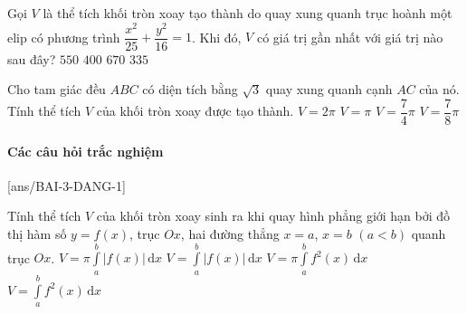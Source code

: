 \begin{vd}%
	Gọi $V$ là thể tích khối tròn xoay tạo thành do quay xung quanh trục hoành một elip có phương trình $\dfrac{x^2}{25}+\dfrac{y^2}{16}=1$. Khi đó, $V$ có giá trị gần nhất với giá trị nào sau đây?
	\choice
	{$550$}
	{$400$}
	{$670$}
	{\True $335$}
\end{vd}

\begin{vd}%
	Cho tam giác đều $ABC$ có diện tích bằng $\sqrt{3}$ quay xung quanh cạnh $AC$ của nó. Tính thể tích $V$ của khối tròn xoay được tạo thành. 
	\choice
	{\True $V=2\pi$}
	{$V=\pi$}
	{$V=\dfrac{7}{4}\pi$}
	{$V=\dfrac{7}{8}\pi$}
\end{vd}

\paragraph{Các câu hỏi trắc nghiệm}

[ans/BAI-3-DANG-1]

\begin{ex}%
	Tính thể tích $V$ của khối tròn xoay sinh ra khi quay hình phẳng giới hạn bởi đồ thị hàm số $y=f(x)$, trục $Ox$, hai đường thẳng $x=a$, $x=b$ $(a<b)$ quanh trục $Ox$. 
	\choice
	{$V=\pi\displaystyle\int\limits_a^b\left|f(x)\right|\mathrm{\,d}x$}
	{$V=\displaystyle\int\limits_a^b\left|f(x)\right|\mathrm{\,d}x$}
	{\True $V=\pi\displaystyle\int\limits_a^b f^2(x)\mathrm{\,d}x$}
	{$V=\displaystyle\int\limits_a^b f^2(x)\mathrm{\,d}x$}
\end{ex}

